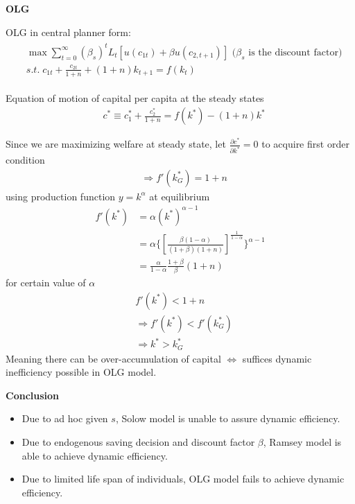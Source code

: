 \documentclass{article}
\providecommand{\tightlist}{
  \setlength{\itemsep}{0pt}
  \setlength{\parskip}{0pt}}
\begin{document}
\textbf{OLG}

OLG in central planner form:
\begin{align}
\begin{split}
&\max \sum\limits_{t=0}^{\infty}(\beta_{s})^{t}L_{t}[u(c_{1t})+\beta u(c_{2,t+1})] \text{ ($\beta_s$ is the discount factor)}
\\&s.t. \; 
c_{1t}+\frac{c_{2t}}{1+n}+(1+n)k_{t+1}=f(k_{t})
\end{split}
\end{align}

Equation of motion of capital per capita at the steady states
\begin{align}
&c^{*}\equiv c_{1}^{*}+\frac{c_{2}^{*}}{1+n}=f(k^{*})-(1+n)k^{*}
\end{align}

Since we are maximizing welfare at steady state, let $\frac{\partial  c^{*}}{\partial  k^{*}}=0$ to acquire first order condition
\begin{align}
&\Rightarrow f'(k^{*}_{G})=1+n
\end{align}
using production function $y=k^\alpha$ at equilibrium
\begin{align}
f'(k^{*})&=\alpha (k^{*})^{\alpha-1}
\\&=\alpha\{[\frac{\beta(1-\alpha)}{(1+\beta)(1+n)}]^{\frac{1}{1-\alpha}}\}^{\alpha-1}
\\&=\frac{\alpha}{1-\alpha}\frac{1+\beta}{\beta}(1+n)
\end{align}
for certain value of $\alpha$
\begin{align}
&f'(k^{*})<1+n
\\&\Rightarrow f'(k^{*})<f'(k^{*}_{G})
\\& \Rightarrow k^{*}>k^{*}_{G}
\end{align}
Meaning there can be over-accumulation of capital $\iff$ suffices dynamic inefficiency possible in OLG model.

\textbf{Conclusion}
\begin{itemize}
\tightlist
  \item Due to ad hoc given $s$, Solow model is unable to assure dynamic efficiency.
  \item Due to endogenous saving decision and discount factor $\beta$, Ramsey model is able to achieve dynamic efficiency.
  \item Due to limited life span of individuals, OLG model fails to achieve dynamic efficiency.
\end{itemize}
\end{document}
